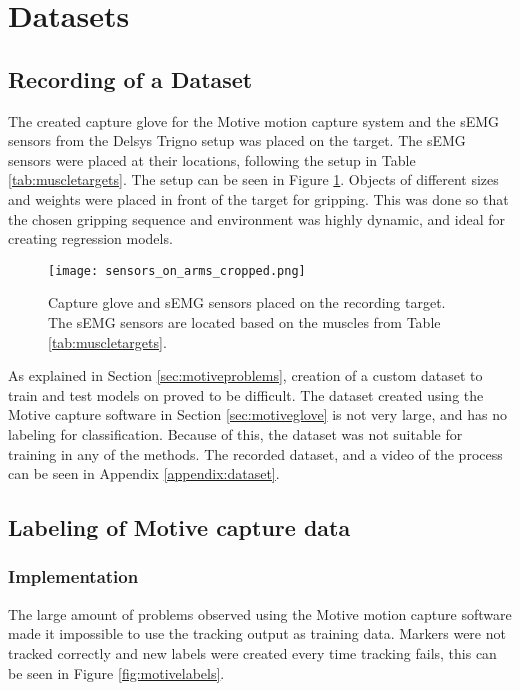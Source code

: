 \documentclass[../main.tex]{subfiles}
\begin{document}
\section{Datasets}

\subsection{Recording of a Dataset}

The created capture glove for the Motive motion capture system \cite{motive} and the \gls{sEMG} sensors from the Delsys Trigno \cite{trigno} setup was placed on the target.
The sEMG sensors were placed at their locations, following the setup in Table \ref{tab:muscletargets}.
The setup can be seen in Figure \ref{fig:musclesensorsonarm}.
Objects of different sizes and weights were placed in front of the target for gripping. 
This was done so that the chosen gripping sequence and environment was highly dynamic, and ideal for creating regression models.

\begin{figure}[H]
\begin{center}
\texttt{[image: sensors\_on\_arms\_cropped.png]}
\caption{Capture glove and \gls{sEMG} sensors placed on the recording target. The sEMG sensors are located based on the muscles from Table \ref{tab:muscletargets}.}
\label{fig:musclesensorsonarm}
\end{center}
\end{figure}

As explained in Section \ref{sec:motiveproblems}, creation of a custom dataset to train and test models on proved to be difficult.
The dataset created using the Motive capture software \cite{motive} in Section \ref{sec:motiveglove} is not very large, and has no labeling for classification.
Because of this, the dataset was not suitable for training in any of the methods.
The recorded dataset, and a video of the process can be seen in Appendix \ref{appendix:dataset}. 

\subsection{Labeling of Motive capture data}

\subsubsection{Implementation}
\label{sec:motivecleaning}

The large amount of problems observed using the Motive motion capture software \cite{motive} made it impossible to use the tracking output as training data.
Markers were not tracked correctly and new labels were created every time tracking fails, this can be seen in Figure \ref{fig:motivelabels}.
\end{document}
